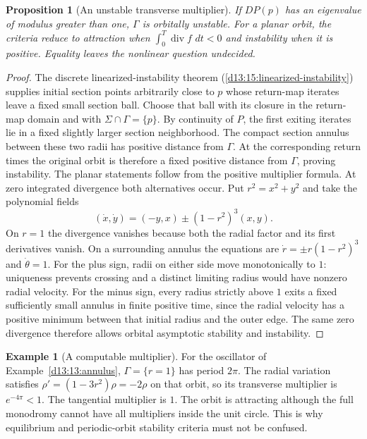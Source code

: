 \documentclass[11pt,oneside]{book}
\newtheorem{proposition}[theorem]{Proposition}
\theoremstyle{definition}
\newtheorem{example}[theorem]{Example}
\theoremstyle{remark}\newtheorem{remark}[theorem]{Remark}
\newcommand{\dd}{\,d}\newcommand{\id}{\operatorname{id}}
\begin{document}
\begin{proposition}[An unstable transverse multiplier]\label{d13:14:orbital-instability}
If \(DP(p)\) has an eigenvalue of modulus greater than one,
\(\Gamma\) is orbitally unstable.
For a planar orbit, the criteria reduce to attraction when
\(\int_0^T\operatorname{div}f\,\dd t<0\) and instability when it is positive.
Equality leaves the nonlinear question undecided.
\end{proposition}
\begin{proof}
The discrete linearized-instability theorem
(\ref{d13:15:linearized-instability}) supplies initial section points
arbitrarily close to \(p\) whose return-map iterates leave a fixed small
section ball. Choose that ball with its closure in the return-map
domain and with \(\Sigma\cap\Gamma=\{p\}\).
By continuity of \(P\), the first exiting iterates lie in a fixed
slightly larger section neighborhood. The compact section annulus
between these two radii has positive distance from \(\Gamma\).
At the corresponding return times the original orbit is therefore
a fixed positive distance from \(\Gamma\), proving instability.
The planar statements follow from the positive multiplier formula.
At zero integrated divergence both alternatives occur. Put $r^2=x^2+y^2$
and take the polynomial fields
\[
 (\dot x,\dot y)=(-y,x)\pm(1-r^2)^3(x,y).
\]
On $r=1$ the divergence vanishes because both the radial factor and
its first derivatives vanish. On a surrounding annulus the equations
are $\dot r=\pm r(1-r^2)^3$ and $\dot\theta=1$. For the plus sign,
radii on either side move monotonically to $1$: uniqueness prevents
crossing and a distinct limiting radius would have nonzero radial
velocity. For the minus sign, every radius strictly above $1$ exits
a fixed sufficiently small annulus in finite positive time, since the
radial velocity has a positive minimum between that initial radius
and the outer edge. The same zero divergence therefore allows orbital
asymptotic stability and instability.
\end{proof}

\begin{example}[A computable multiplier]\label{d13:14:radial-example}
For the oscillator of Example~\ref{d13:13:annulus}, \(\Gamma=\{r=1\}\)
has period \(2\pi\). The radial variation satisfies
\(\rho'=(1-3r^2)\rho=-2\rho\) on that orbit, so its transverse multiplier
is \(e^{-4\pi}<1\). The tangential multiplier is \(1\).
The orbit is attracting although the full monodromy cannot have all
multipliers inside the unit circle. This is why equilibrium and
periodic-orbit stability criteria must not be confused.
\end{example}
\end{document}
